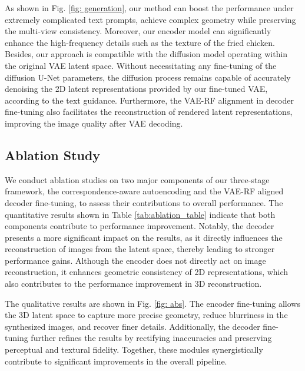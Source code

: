 As shown in Fig. \ref{fig: generation}, our method can boost the performance under extremely complicated text prompts, achieve complex geometry while preserving the multi-view consistency. Moreover, our encoder model can significantly enhance the high-frequency details such as the texture of the fried chicken. Besides, our approach is compatible with the diffusion model operating within the original VAE latent space. Without necessitating any fine-tuning of the diffusion U-Net parameters, the diffusion process remains capable of accurately denoising the 2D latent representations provided by our fine-tuned VAE, according to the text guidance. Furthermore, the VAE-RF alignment in decoder fine-tuning also facilitates the reconstruction of rendered latent representations, improving the image quality after VAE decoding.




\subsection{Ablation Study}
We conduct ablation studies on two major components of our three-stage framework, the correspondence-aware autoencoding and the VAE-RF aligned decoder fine-tuning, to assess their contributions to overall performance. The quantitative results shown in Table \ref{tab:ablation_table} indicate that both components contribute to performance improvement. Notably, the decoder presents a more significant impact on the results, as it directly influences the reconstruction of images from the latent space, thereby leading to stronger performance gains. Although the encoder does not directly act on image reconstruction, it enhances geometric consistency of 2D representations, which also contributes to the performance improvement in 3D reconstruction.





The qualitative results are shown in Fig. \ref{fig: abs}. The encoder fine-tuning allows the 3D latent space to capture more precise geometry, reduce blurriness in the synthesized images, and recover finer details. Additionally, the decoder fine-tuning further refines the results by rectifying inaccuracies and preserving perceptual and textural fidelity. Together, these modules synergistically contribute to significant improvements in the overall pipeline.



